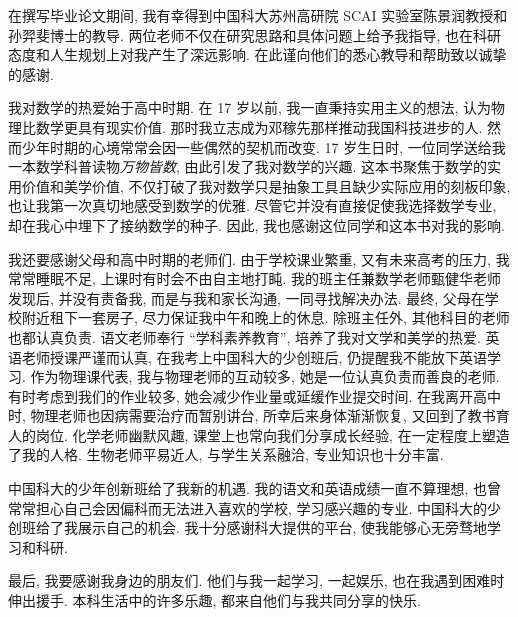
\begin{acknowledgements}
  在撰写毕业论文期间, 我有幸得到中国科大苏州高研院 SCAI 实验室陈景润教授和孙羿斐博士的教导.
  两位老师不仅在研究思路和具体问题上给予我指导, 也在科研态度和人生规划上对我产生了深远影响.
  在此谨向他们的悉心教导和帮助致以诚挚的感谢.

  我对数学的热爱始于高中时期.
  在 17 岁以前, 我一直秉持实用主义的想法, 认为物理比数学更具有现实价值.
  那时我立志成为邓稼先那样推动我国科技进步的人.
  然而少年时期的心境常常会因一些偶然的契机而改变.
  17 岁生日时, 一位同学送给我一本数学科普读物\emph{万物皆数}, 由此引发了我对数学的兴趣.
  这本书聚焦于数学的实用价值和美学价值, 不仅打破了我对数学只是抽象工具且缺少实际应用的刻板印象, 也让我第一次真切地感受到数学的优雅.
  尽管它并没有直接促使我选择数学专业, 却在我心中埋下了接纳数学的种子.
  因此, 我也感谢这位同学和这本书对我的影响.

  我还要感谢父母和高中时期的老师们.
  由于学校课业繁重, 又有未来高考的压力, 我常常睡眠不足, 上课时有时会不由自主地打盹.
  我的班主任兼数学老师甄健华老师发现后, 并没有责备我, 而是与我和家长沟通, 一同寻找解决办法.
  最终, 父母在学校附近租下一套房子, 尽力保证我中午和晚上的休息.
  除班主任外, 其他科目的老师也都认真负责.
  语文老师奉行 ``学科素养教育'', 培养了我对文学和美学的热爱.
  英语老师授课严谨而认真, 在我考上中国科大的少创班后, 仍提醒我不能放下英语学习.
  作为物理课代表, 我与物理老师的互动较多, 她是一位认真负责而善良的老师.
  有时考虑到我们的作业较多, 她会减少作业量或延缓作业提交时间.
  在我离开高中时, 物理老师也因病需要治疗而暂别讲台, 所幸后来身体渐渐恢复, 又回到了教书育人的岗位.
  化学老师幽默风趣, 课堂上也常向我们分享成长经验, 在一定程度上塑造了我的人格.
  生物老师平易近人, 与学生关系融洽, 专业知识也十分丰富.

  中国科大的少年创新班给了我新的机遇.
  我的语文和英语成绩一直不算理想, 也曾常常担心自己会因偏科而无法进入喜欢的学校, 学习感兴趣的专业.
  中国科大的少创班给了我展示自己的机会.
  我十分感谢科大提供的平台, 使我能够心无旁骛地学习和科研.

  最后, 我要感谢我身边的朋友们.
  他们与我一起学习, 一起娱乐, 也在我遇到困难时伸出援手.
  本科生活中的许多乐趣, 都来自他们与我共同分享的快乐.
\end{acknowledgements}
